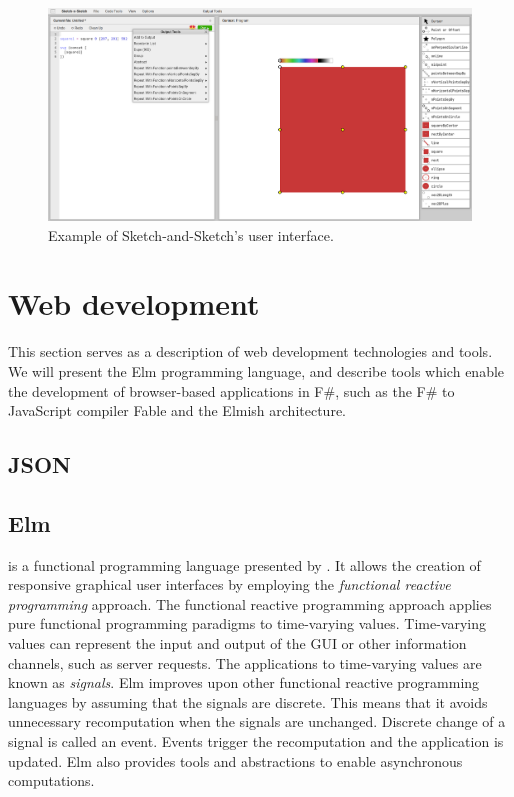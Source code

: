 \begin{figure}[h]
	\centering
	\includegraphics[width=1\linewidth]{img/sketch.pdf}
	\caption{Example of Sketch-and-Sketch's user interface. }
	\label{fig:sketch}
\end{figure}

\section{Web development}

This section serves as a description of web development technologies and tools.
We will present the Elm programming language,
and describe tools which enable the development of browser-based applications in F\#, such as the F\# to JavaScript compiler Fable and the Elmish architecture.

\subsection{JSON}

\subsection{Elm}
\citet{eml} is a functional programming language presented by \citet{Czaplicki_Chong_2013}.
It allows the creation of responsive graphical user interfaces by employing the
\emph{functional reactive programming} approach. The functional reactive programming
approach applies pure functional programming paradigms to time-varying values.
Time-varying values can represent the input and output of the GUI or other information
channels, such as server requests. The applications to time-varying values are known
as \emph{signals}. Elm improves upon other functional reactive programming languages
by assuming that the signals are discrete. This means that it avoids unnecessary
recomputation when the signals are unchanged. Discrete change of a signal is called
an event. Events trigger the recomputation and the application is updated. Elm also
provides tools and abstractions to enable asynchronous computations.

